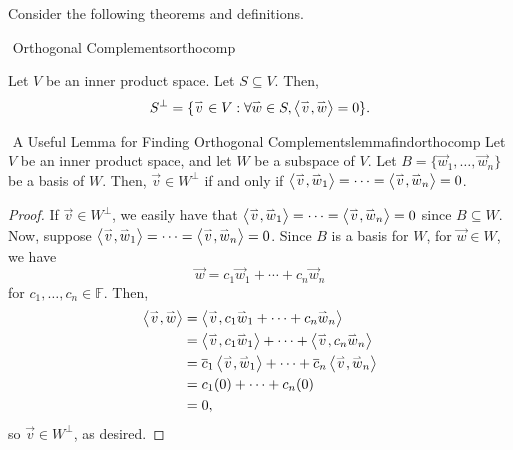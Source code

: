         Consider the following theorems and definitions.
        \begin{definition}{\Stop\,\,Orthogonal Complements}{orthocomp}

            Let \(V\) be an inner product space. Let \(S\subseteq V\). Then,
            \begin{equation*}
                S^{\perp}=\{\vec{v}\in V:\forall \vec{w}\in S, \iprod{\vec{v}}{\vec{w}}=0\}.
            \end{equation*}

        \end{definition}
        \begin{theorem}{\Stop\,\,A Useful Lemma for Finding Orthogonal Complements}{lemmafindorthocomp}
            Let \(V\) be an inner product space, and let \(W\) be a subspace of \(V\). Let \(B=\{\vec{w}_1,\ldots,\vec{w}_n\}\) be a basis of \(W\). Then, \(\vec{v}\in W^\perp\) if and only if \(\iprod{\vec{v}}{\vec{w}_1}=\cdots=\iprod{\vec{v}}{\vec{w}_n}=0\).
            \begin{proof}
                If \(\vec{v}\in W^\perp\), we easily have that \(\iprod{\vec{v}}{\vec{w}_1}=\cdots=\iprod{\vec{v}}{\vec{w}_n}=0\) since \(B\subseteq W\). Now, suppose \(\iprod{\vec{v}}{\vec{w}_1}=\cdots=\iprod{\vec{v}}{\vec{w}_n}=0\). Since \(B\) is a basis for \(W\), for \(\vec{w}\in W\), we have
                \begin{equation*}
                    \vec{w}=c_1\vec{w}_1+\cdots+c_n\vec{w}_n
                \end{equation*}
                for \(c_1,\ldots,c_n\in\mathbb{F}\). Then,
                \begin{align*}
                    \iprod{\vec{v}}{\vec{w}}&=\iprod{\vec{v}}{c_1\vec{w}_1+\cdots+c_n\vec{w}_n} \\
                    &=\iprod{\vec{v}}{c_1\vec{w}_1}+\cdots+\iprod{\vec{v}}{c_n\vec{w}_n} \\
                    &=\bar{c}_1\iprod{\vec{v}}{\vec{w}_1}+\cdots+\bar{c}_n\iprod{\vec{v}}{\vec{w}_n} \\
                    &=c_1(0)+\cdots+c_n(0) \\
                    &=0,
                \end{align*}
                so \(\vec{v}\in W^\perp\), as desired.
            \end{proof}
        \end{theorem}
        \vphantom
        \\
        \\
